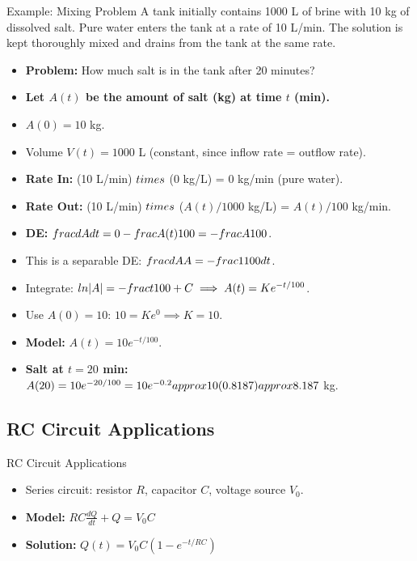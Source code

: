 \documentclass[10pt,aspectratio=169]{beamer}
\begin{document}
\begin{frame}{Example: Mixing Problem}
    A tank initially contains 1000 L of brine with 10 kg of dissolved salt. Pure water enters the tank at a rate of 10 L/min. The solution is kept thoroughly mixed and drains from the tank at the same rate.
    \begin{itemize}
        \item \textbf{Problem:} How much salt is in the tank after 20 minutes?
        \item \textbf{Let $A(t)$ be the amount of salt (kg) at time $t$ (min).}
        \item $A(0) = 10$ kg.
        \item Volume $V(t) = 1000$ L (constant, since inflow rate = outflow rate).
        \item \textbf{Rate In:} (10 L/min) $\\times$ (0 kg/L) = 0 kg/min (pure water).
        \item \textbf{Rate Out:} (10 L/min) $\\times$ ($A(t)/1000$ kg/L) = $A(t)/100$ kg/min.
        \item \textbf{DE:} $\\frac{dA}{dt} = 0 - \\frac{A(t)}{100} = -\\frac{A}{100}$.
        \item This is a separable DE: $\\frac{dA}{A} = -\\frac{1}{100} dt$.
        \item Integrate: $\\ln|A| = -\\frac{t}{100} + C \implies A(t) = Ke^{-t/100}$.
        \item Use $A(0)=10$: $10 = Ke^0 \implies K=10$.
        \item \textbf{Model:} $A(t) = 10e^{-t/100}$.
        \item \textbf{Salt at $t=20$ min:} $A(20) = 10e^{-20/100} = 10e^{-0.2} \\approx 10(0.8187) \\approx 8.187$ kg.
    \end{itemize}
\end{frame}

\subsection{RC Circuit Applications}
\begin{frame}{RC Circuit Applications}
    \begin{itemize}
        \item Series circuit: resistor $R$, capacitor $C$, voltage source $V_0$.
        \item \textbf{Model:} $RC\frac{dQ}{dt} + Q = V_0C$
        \item \textbf{Solution:} $Q(t) = V_0C(1 - e^{-t/RC})$
    \end{itemize}
\end{frame}
\end{document}
